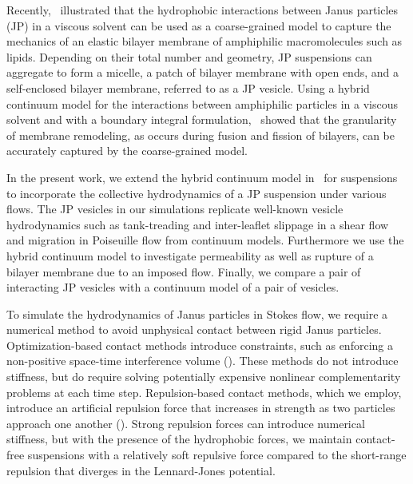 \documentclass[lineno]{jfm}
\begin{document}
Recently,~\cite{Fu20} illustrated that the hydrophobic interactions
between Janus particles (JP) in a viscous solvent can be used as a
coarse-grained model to capture the mechanics of an elastic bilayer
membrane of amphiphilic macromolecules such as lipids. Depending on
their total number and geometry, JP suspensions can aggregate to form a
micelle, a patch of bilayer membrane with open ends, and a self-enclosed
bilayer membrane, referred to as a JP vesicle. Using a hybrid continuum
model for the interactions between amphiphilic particles in a viscous
solvent and with a boundary integral formulation,~\cite{Fu20} showed
that the granularity of membrane remodeling, as occurs during fusion and
fission of bilayers, can be accurately captured by the coarse-grained
model.  

In the present work, we extend the hybrid continuum model in~\cite{Fu20}
for suspensions to incorporate the collective hydrodynamics of
a JP suspension under various flows. The JP vesicles in our
simulations replicate well-known vesicle hydrodynamics
such as tank-treading and inter-leaflet slippage in a shear flow and
migration in Poiseuille flow from continuum models. Furthermore we use
the hybrid continuum model to investigate permeability as well as rupture of a
bilayer membrane due to an imposed flow.  Finally, we compare a pair of
interacting JP vesicles with a continuum model of a pair of vesicles.


To simulate the hydrodynamics of Janus particles in Stokes flow,
we require a numerical method to avoid unphysical contact between rigid
Janus particles. Optimization-based contact methods introduce
constraints, such as enforcing a non-positive space-time interference
volume (\cite{lu-rah-zor2017, Lukas19, yan-cor-mal-vee-she2020}). These
methods do not introduce stiffness, but do require solving potentially
expensive nonlinear complementarity problems at each time step.
Repulsion-based contact methods, which we employ, introduce an
artificial repulsion force that increases in strength as two particles
approach one another (\cite{glo-pan-hes-jos-per2001, fen-mic2004,
kab-qua-bir2018}). Strong repulsion forces can introduce numerical
stiffness, but with the presence of the hydrophobic forces, we maintain
contact-free suspensions with a relatively soft repulsive
force compared to the short-range repulsion that diverges in the Lennard-Jones potential.
\end{document}
